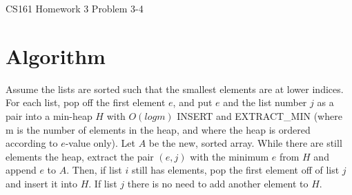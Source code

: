 \documentclass[12pt]{article}
\begin{document}
\begin{center}
{\Large CS161 Homework 3 Problem 3-4}

\end{center}

\section*{Algorithm}
Assume the lists are sorted such that the smallest elements are at lower indices. For each list, pop off the first element $e$, and put $e$ and the list number $j$ as a pair into a min-heap $H$ with $O(log m)$ INSERT and EXTRACT\_MIN (where m is the number of elements in the heap, and where the heap is ordered according to $e$-value only). Let $A$ be the new, sorted array. While there are still elements the heap, extract the pair $(e, j)$ with the minimum $e$ from $H$ and append $e$ to $A$. Then, if list $i$ still has elements, pop the first element off of list $j$ and insert it into $H$. If list $j$ there is no need to add another element to $H$. 
\end{document}
